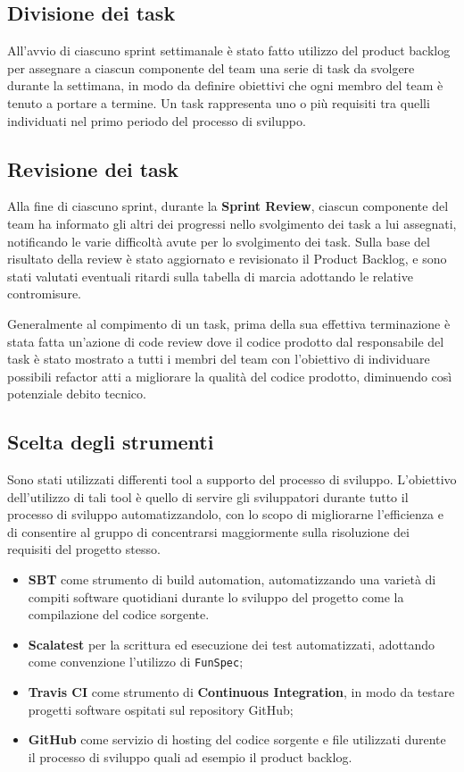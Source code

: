 \subsection{Divisione dei task}
All'avvio di ciascuno sprint settimanale è stato fatto utilizzo del product backlog per assegnare a ciascun componente del team una serie di task da svolgere durante la settimana, in modo da definire obiettivi che ogni membro del team è tenuto a portare a termine. Un task rappresenta uno o più requisiti tra quelli individuati nel primo periodo del processo di sviluppo.

\subsection{Revisione dei task}
Alla fine di ciascuno sprint, durante la \textbf{Sprint Review}, ciascun componente del team ha informato gli altri dei progressi nello svolgimento dei task a lui assegnati, notificando le varie difficoltà avute per lo svolgimento dei task. Sulla base del risultato della review è stato aggiornato e revisionato il Product Backlog, e sono stati valutati eventuali ritardi sulla tabella di marcia adottando le relative contromisure.

Generalmente al compimento di un task, prima della sua effettiva terminazione è stata fatta un'azione di code review dove il codice prodotto dal responsabile del task è stato mostrato a tutti i membri del team con l'obiettivo di individuare possibili refactor atti a migliorare la qualità del codice prodotto, diminuendo così potenziale debito tecnico.

\subsection{Scelta degli strumenti}
Sono stati utilizzati differenti tool a supporto del processo di sviluppo. L'obiettivo dell'utilizzo di tali tool è quello di servire gli sviluppatori durante tutto il processo di sviluppo automatizzandolo, con lo scopo di migliorarne l'efficienza e di consentire al gruppo di concentrarsi maggiormente sulla risoluzione dei requisiti del progetto stesso.

\begin{itemize}
    \item \textbf{SBT} come strumento di build automation, automatizzando una varietà di compiti software quotidiani durante lo sviluppo del progetto come la compilazione del codice sorgente.
    \item \textbf{Scalatest} per la scrittura ed esecuzione dei test automatizzati, adottando come convenzione l'utilizzo di \texttt{FunSpec};
    \item \textbf{Travis CI} come strumento di \textbf{Continuous Integration}, in modo da testare progetti software ospitati sul repository GitHub;
    \item \textbf{GitHub} come servizio di hosting del codice sorgente e file utilizzati durente il processo di sviluppo quali ad esempio il product backlog. 
\end{itemize}